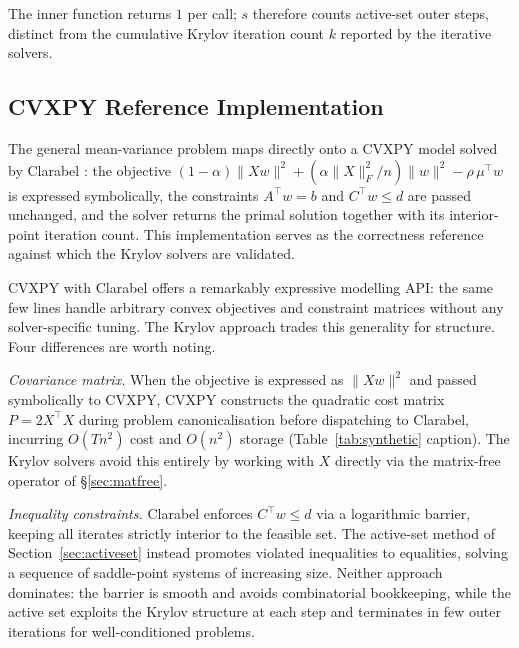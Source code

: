 \documentclass{siam/siamart}
\begin{document}
The inner function returns $1$ per call; $s$ therefore counts active-set outer steps,
distinct from the cumulative Krylov iteration count $k$ reported by the iterative solvers.

\subsection{CVXPY Reference Implementation}

The general mean-variance problem maps directly onto a CVXPY \cite{diamond2016}
model solved by Clarabel \cite{clarabel2024}: the objective $(1-\alpha)\|Xw\|^2 + (\alpha\|X\|_F^2/n)\|w\|^2 - \rho\,\mu^\top w$
is expressed symbolically, the constraints $A^\top w = b$ and $C^\top w \leq d$
are passed unchanged, and the solver returns the primal solution together with
its interior-point iteration count.  This implementation serves as the
correctness reference against which the Krylov solvers are validated.

CVXPY \cite{diamond2016} with Clarabel \cite{clarabel2024} offers a remarkably
expressive modelling API: the same
few lines handle arbitrary convex objectives and constraint matrices without any
solver-specific tuning.  The Krylov approach trades this generality for
structure.  Four differences are worth noting.

\textit{Covariance matrix.}  When the objective is expressed as $\|Xw\|^2$ and passed
symbolically to CVXPY, CVXPY constructs the quadratic cost matrix $P = 2X^\top X$
during problem canonicalisation before dispatching to Clarabel, incurring $O(Tn^2)$
cost and $O(n^2)$ storage (Table~\ref{tab:synthetic} caption).  The Krylov solvers
avoid this entirely by working with $X$ directly via the matrix-free operator of
\S\ref{sec:matfree}.

\textit{Inequality constraints.}  Clarabel enforces $C^\top w \leq d$ via a
logarithmic barrier, keeping all iterates strictly interior to the feasible
set.  The active-set method of Section~\ref{sec:activeset} instead promotes
violated inequalities to equalities, solving a sequence of saddle-point systems
of increasing size.  Neither approach dominates: the barrier is smooth and
avoids combinatorial bookkeeping, while the active set exploits the Krylov
structure at each step and terminates in few outer iterations for
well-conditioned problems.
\end{document}
